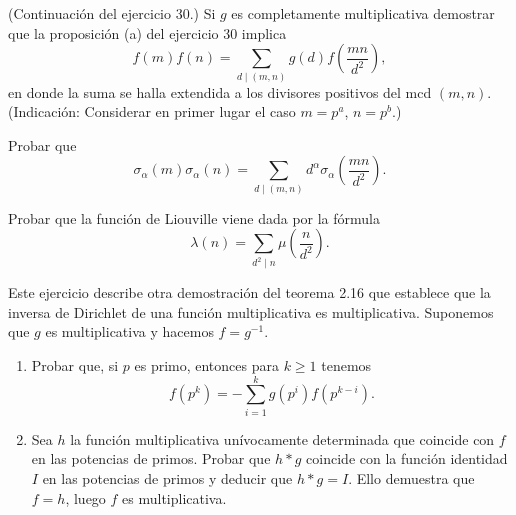 \documentclass[12pt,a4paper]{book}
\begin{document}
    \begin{ejercicio}
        (Continuación del ejercicio 30.) Si $g$ es completamente multiplicativa demostrar
        que la proposición (a) del ejercicio 30 implica
        \begin{equation*}
            f(m)f(n)=\sum_{d\mid(m,n)}g(d)f\left(\frac{mn}{d^{2}}\right),
        \end{equation*}
        en donde la suma se halla extendida a los divisores positivos del mcd $(m,n)$.
        (Indicación: Considerar en primer lugar el caso $m=p^{a}$, $n=p^{b}$.)
    \end{ejercicio}

    \begin{ejercicio}
        Probar que
        \begin{equation*}
            \sigma_{\alpha}(m)\sigma_{\alpha}(n)=\sum_{d\mid(m,n)}d^{\alpha}\sigma_{\alpha}\left(\frac{mn}{d^{2}}\right).
        \end{equation*}
    \end{ejercicio}

    \begin{ejercicio}
        Probar que la función de Liouville viene dada por la fórmula
        \begin{equation*}
            \lambda(n)=\sum_{d^{2}\mid n}\mu\left(\frac{n}{d^{2}}\right).
        \end{equation*}
    \end{ejercicio}

    \begin{ejercicio}
        Este ejercicio describe otra demostración del teorema 2.16 que establece que la
        inversa de Dirichlet de una función multiplicativa es multiplicativa. Suponemos
        que $g$ es multiplicativa y hacemos $f=g^{-1}$.
        \begin{enumerate}
            \item[(a)] Probar que, si $p$ es primo, entonces para $k\geq1$ tenemos
            \begin{equation*}
                f(p^{k})=-\sum_{i=1}^{k}g(p^{i})f(p^{k-i}).
            \end{equation*}
            \item[(b)] Sea $h$ la función multiplicativa unívocamente determinada que
            coincide con $f$ en las potencias de primos. Probar que $h*g$ coincide con la
            función identidad $I$ en las potencias de primos y deducir que $h*g=I$. Ello
            demuestra que $f=h$, luego $f$ es multiplicativa.
        \end{enumerate}
    \end{ejercicio}
\end{document}
